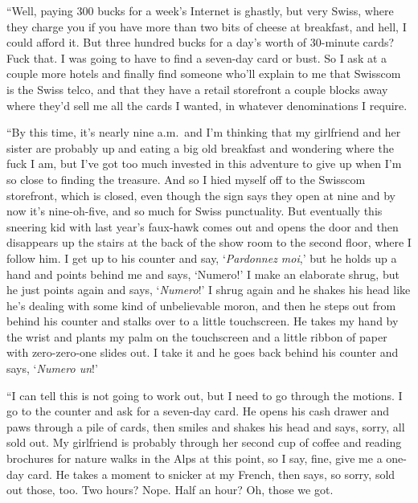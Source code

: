 ``Well, paying 300 bucks for a week's Internet is ghastly, but very
Swiss, where they charge you if you have more than two bits of cheese
at breakfast, and hell, I could afford it.  But three hundred bucks
for a day's worth of 30-minute cards?  Fuck that.  I was going to have
to find a seven-day card or bust.  So I ask at a couple more hotels
and finally find someone who'll explain to me that Swisscom is the
Swiss telco, and that they have a retail storefront a couple blocks
away where they'd sell me all the cards I wanted, in whatever
denominations I require.

``By this time, it's nearly nine a.m.\  and I'm thinking that my
girlfriend and her sister are probably up and eating a big old
breakfast and wondering where the fuck I am, but I've got too much
invested in this adventure to give up when I'm so close to finding the
treasure.  And so I hied myself off to the Swisscom storefront, which
is closed, even though the sign says they open at nine and by now it's
nine-oh-five, and so much for Swiss punctuality.  But eventually this
sneering kid with last year's faux-hawk comes out and opens the door
and then disappears up the stairs at the back of the show room to the
second floor, where I follow him.  I get up to his counter and say,
`\textit{Pardonnez moi},' but he holds up a hand and points behind me
and says, `Numero!' I make an elaborate shrug, but he just points
again and says, `\textit{Numero}!' I shrug again and he shakes his
head like he's dealing with some kind of unbelievable moron, and then
he steps out from behind his counter and stalks over to a little
touchscreen.  He takes my hand by the wrist and plants my palm on the
touchscreen and a little ribbon of paper with zero-zero-one slides
out.  I take it and he goes back behind his counter and says,
`\textit{Numero un}!'

``I can tell this is not going to work out, but I need to go through
the motions.  I go to the counter and ask for a seven-day card.  He
opens his cash drawer and paws through a pile of cards, then smiles
and shakes his head and says, sorry, all sold out.  My girlfriend is
probably through her second cup of coffee and reading brochures for
nature walks in the Alps at this point, so I say, fine, give me a
one-day card.  He takes a moment to snicker at my French, then says,
so sorry, sold out those, too.  Two hours?  Nope.  Half an hour?  Oh,
those we got.

